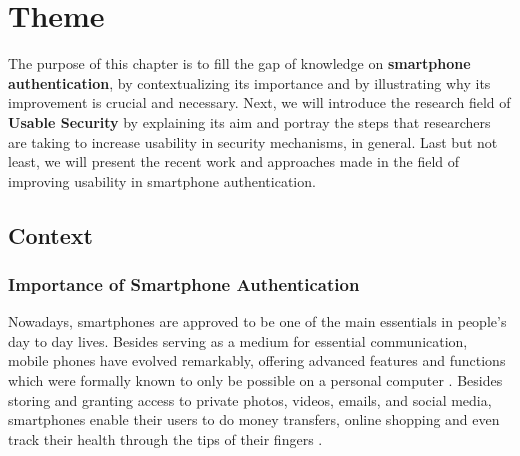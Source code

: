 
\chapter{Theme}\label{ch:second}

The purpose of this chapter is to fill the gap of knowledge on \textbf{smartphone authentication}, by contextualizing its importance and by illustrating why its improvement is crucial and necessary. Next, we will introduce the research field of \textbf{Usable Security} by explaining its aim and portray the steps that researchers are taking to increase usability in security mechanisms, in general. Last but not least, we will present the recent work and approaches made in the field of improving usability in smartphone authentication.   

\section{Context}

\subsection{Importance of Smartphone Authentication} \label{2.1.1}

Nowadays, smartphones are approved to be one of the main essentials in people's day to day lives. Besides serving as a medium for essential communication, mobile phones have evolved remarkably, offering advanced features and functions which were formally known to only be possible on a personal computer \cite{Alsaleh}. Besides storing and granting access to private photos, videos, emails, and social media, smartphones enable their users to do money transfers, online shopping and even track their health through the tips of their fingers \cite{Egelman:2014:YRL:2660267.2660273,Albayram:2017:BUL:3235924.3235929,Schloeglhofer}. \\


